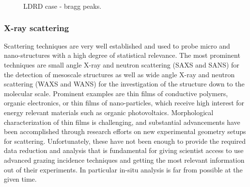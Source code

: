 \begin{figure}[!t]
\centering
{}
\hfil
{}
\caption{LDRD case - bragg peaks.}
\label{fig:ldrd}
\end{figure}



\subsubsection{X-ray scattering}\label{subsec:scattering} %
Scattering techniques are very well established and used to probe micro and nano-structures with a high degree of statistical relevance. The most prominent techniques are small angle X-ray and neutron scattering (SAXS and SANS) for the detection of mesoscale structures as well as wide angle X-ray and neutron scattering (WAXS and WANS) for the investigation of the structure down to the molecular scale. Prominent examples are thin films of conductive polymers, organic electronics, or thin films of nano-particles, which receive high interest for energy relevant materials such as organic photovoltaics. Morphological characterization of thin films is challenging, and substantial advancements have been accomplished through research efforts on new experimental geometry setups for scattering. Unfortunately, these have not been enough to provide the required data reduction and analysis that is fundamental for giving scientist access to use advanced grazing incidence techniques and getting the most relevant information out of their experiments. In particular in-situ analysis is far from possible at the given time.

